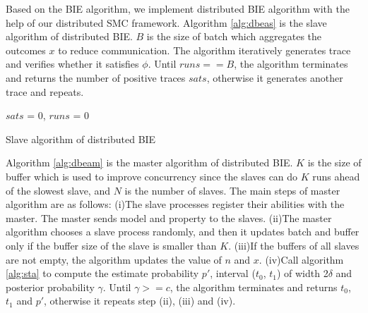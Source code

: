 Based on the BIE algorithm, we implement distributed BIE algorithm with the help of our distributed SMC framework. Algorithm \ref{alg:dbeas} is the slave algorithm of distributed BIE. $B$ is the size of batch which aggregates the outcomes $x$ to reduce communication. The algorithm iteratively generates trace and verifies whether it satisfies $\phi$. Until $runs == B$, the algorithm terminates and returns the number of positive traces $sats$, otherwise it generates another trace and repeats.

\begin{algorithm}[t]
{}
$sats$ = 0, $runs$ = 0\;
\caption{Slave algorithm of distributed BIE}
\label{alg:dbeas}
\end{algorithm}

Algorithm \ref{alg:dbeam} is the master algorithm of distributed BIE. \emph{$K$} is the size of buffer which is used to improve concurrency since the slaves can do \emph{$K$} runs ahead of the slowest slave, and \emph{$N$} is the number of slaves. The main steps of master algorithm are as follows: (i)The slave processes register their abilities with the master. The master sends model and property to the slaves. (ii)The master algorithm chooses a slave process randomly, and then it updates batch and buffer only if the buffer size of the slave is smaller than \emph{$K$}. (iii)If the buffers of all slaves are not empty, the algorithm updates the value of \emph{$n$} and \emph{$x$}. (iv)Call algorithm \ref{alg:sta} to compute the estimate probability $p'$, interval ($t_0$, $t_1$) of width 2$\delta$ and posterior probability $\gamma$. Until $\gamma >= c$, the algorithm terminates and returns $t_0$, $t_1$ and $p'$, otherwise it repeats step (ii), (iii) and (iv).

